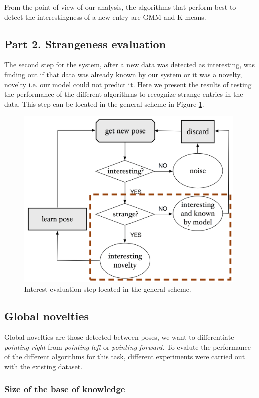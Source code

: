 From the point of view of our analysis, the algorithms that perform best to detect the interestingness of a new entry are GMM and K-means.

\subsection{Part 2. Strangeness evaluation} \label{4.5.2}

The second step for the system, after a new data was detected as interesting, was finding out if that data was already known by our system or it was a novelty, novelty i.e. our model could not predict it. Here we present the results of testing the performance of the different algorithms to recognize strange entries in the data. This step can be located in the general scheme in Figure \ref{fig:stran}. 

\begin{figure}[h]
\includegraphics[width=11cm]{Figures/Esquema_strange}
\centering
\caption{Interest evaluation step located in the general scheme. \label{fig:stran}}
\end{figure}

\subsection{Global novelties}

Global novelties are those detected between poses, we want to differentiate \emph{pointing right} from \emph{pointing left} or \emph{pointing forward}. To evalute the performance of the different algorithms for this task, different experiments were carried out with the existing dataset.

\subsubsection{Size of the base of knowledge}

